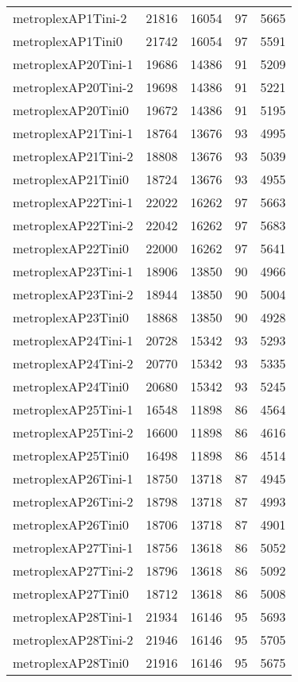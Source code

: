 \begin{longtable}{lrrrr}
metroplexAP1Tini-2 & 21816 & 16054 & 97 & 5665 \\
metroplexAP1Tini0 & 21742 & 16054 & 97 & 5591 \\
metroplexAP20Tini-1 & 19686 & 14386 & 91 & 5209 \\
metroplexAP20Tini-2 & 19698 & 14386 & 91 & 5221 \\
metroplexAP20Tini0 & 19672 & 14386 & 91 & 5195 \\
metroplexAP21Tini-1 & 18764 & 13676 & 93 & 4995 \\
metroplexAP21Tini-2 & 18808 & 13676 & 93 & 5039 \\
metroplexAP21Tini0 & 18724 & 13676 & 93 & 4955 \\
metroplexAP22Tini-1 & 22022 & 16262 & 97 & 5663 \\
metroplexAP22Tini-2 & 22042 & 16262 & 97 & 5683 \\
metroplexAP22Tini0 & 22000 & 16262 & 97 & 5641 \\
metroplexAP23Tini-1 & 18906 & 13850 & 90 & 4966 \\
metroplexAP23Tini-2 & 18944 & 13850 & 90 & 5004 \\
metroplexAP23Tini0 & 18868 & 13850 & 90 & 4928 \\
metroplexAP24Tini-1 & 20728 & 15342 & 93 & 5293 \\
metroplexAP24Tini-2 & 20770 & 15342 & 93 & 5335 \\
metroplexAP24Tini0 & 20680 & 15342 & 93 & 5245 \\
metroplexAP25Tini-1 & 16548 & 11898 & 86 & 4564 \\
metroplexAP25Tini-2 & 16600 & 11898 & 86 & 4616 \\
metroplexAP25Tini0 & 16498 & 11898 & 86 & 4514 \\
metroplexAP26Tini-1 & 18750 & 13718 & 87 & 4945 \\
metroplexAP26Tini-2 & 18798 & 13718 & 87 & 4993 \\
metroplexAP26Tini0 & 18706 & 13718 & 87 & 4901 \\
metroplexAP27Tini-1 & 18756 & 13618 & 86 & 5052 \\
metroplexAP27Tini-2 & 18796 & 13618 & 86 & 5092 \\
metroplexAP27Tini0 & 18712 & 13618 & 86 & 5008 \\
metroplexAP28Tini-1 & 21934 & 16146 & 95 & 5693 \\
metroplexAP28Tini-2 & 21946 & 16146 & 95 & 5705 \\
metroplexAP28Tini0 & 21916 & 16146 & 95 & 5675 \\

\end{longtable}
